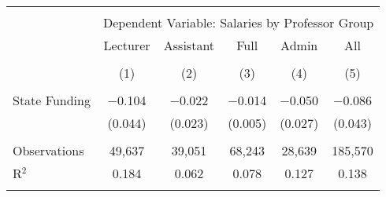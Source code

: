 
\begin{tabular}{@{\extracolsep{5pt}}lccccc} 
\\[-1.8ex]\hline 
\hline \\[-1.8ex] 
 & \multicolumn{5}{c}{Dependent Variable: Salaries by Professor Group} \\ 
\cline{2-6} 
 & Lecturer & Assistant & Full & Admin & All \\ 
\\[-1.8ex] & (1) & (2) & (3) & (4) & (5)\\ 
\hline \\[-1.8ex] 
 State Funding & $-$0.104 & $-$0.022 & $-$0.014 & $-$0.050 & $-$0.086 \\ 
  & (0.044) & (0.023) & (0.005) & (0.027) & (0.043) \\ 
 \hline \\[-1.8ex] 
Observations & 49,637 & 39,051 & 68,243 & 28,639 & 185,570 \\ 
R$^{2}$ & 0.184 & 0.062 & 0.078 & 0.127 & 0.138 \\ 
\hline 
\hline \\[-1.8ex] 
\end{tabular} 
